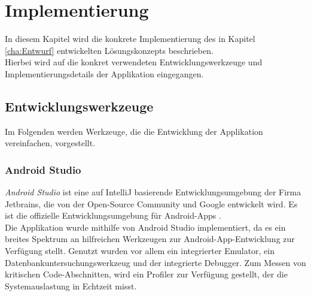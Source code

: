 \documentclass[oneside]{ausarbeitung}
\begin{document}
\chapter{Implementierung}
\label{cha:implementierung}
In diesem Kapitel wird die konkrete Implementierung des in Kapitel
\ref{cha:Entwurf} entwickelten Lösungskonzepts beschrieben.\\
Hierbei wird auf die konkret verwendeten Entwicklungswerkzeuge und Implementierungsdetails der Applikation eingegangen.
\section{Entwicklungswerkzeuge}
Im Folgenden werden Werkzeuge, die die Entwicklung der Applikation vereinfachen, vorgestellt.
\subsection{Android Studio}
\textit{Android Studio} ist eine auf IntelliJ basierende Entwicklungsumgebung der Firma Jetbrains, die von der Open-Source Community und Google entwickelt wird. Es ist die offizielle Entwicklungsumgebung für Android-Apps \cite{android-studio-basics}.\\
Die Applikation wurde mithilfe von Android Studio implementiert, da es ein breites Spektrum an hilfreichen Werkzeugen zur Android-App-Entwicklung zur Verfügung stellt. Genutzt wurden vor allem ein integrierter Emulator, ein Datenbankuntersuchungswerkzeug und der integrierte Debugger. Zum Messen von kritischen Code-Abschnitten, wird ein Profiler zur Verfügung gestellt, der die Systemauslastung in Echtzeit misst.
\end{document}
